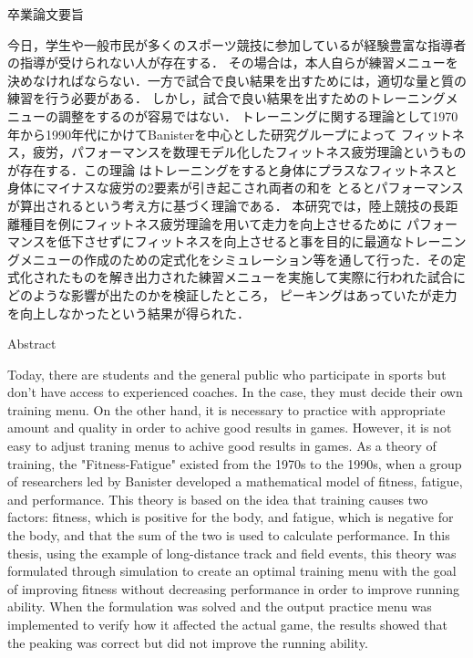 \documentclass[12pt,fleqn]{jreport}
\begin{document}
\begin{center}
  {\huge 卒業論文要旨}
\end{center}
\vspace{3cm}
\large
今日，学生や一般市民が多くのスポーツ競技に参加しているが経験豊富な指導者の指導が受けられない人が存在する．
その場合は，本人自らが練習メニューを決めなければならない．一方で試合で良い結果を出すためには，適切な量と質の練習を行う必要がある．
しかし，試合で良い結果を出すためのトレーニングメニューの調整をするのが容易ではない．
トレーニングに関する理論として1970年から1990年代にかけてBanisterを中心とした研究グループによって
フィットネス，疲労，パフォーマンスを数理モデル化したフィットネス疲労理論というものが存在する．この理論
はトレーニングをすると身体にプラスなフィットネスと身体にマイナスな疲労の2要素が引き起こされ両者の和を
とるとパフォーマンスが算出されるという考え方に基づく理論である．
本研究では，陸上競技の長距離種目を例にフィットネス疲労理論を用いて走力を向上させるために
パフォーマンスを低下させずにフィットネスを向上させると事を目的に最適なトレーニングメニューの作成のための定式化をシミュレーション等を通して行った．その定式化されたものを解き出力された練習メニューを実施して実際に行われた試合にどのような影響が出たのかを検証したところ，
ピーキングはあっていたが走力を向上しなかったという結果が得られた．
\newpage
\thispagestyle{empty}

\begin{center}
  {\huge Abstract}
\end{center}
\vspace{3cm}
Today, there are students and the general public who participate in sports but don't have access to experienced coaches.
In the case, they must decide their own training menu.
On the other hand, it is necessary to practice with appropriate amount and quality in order to achive good results in games.
However, it is not easy to adjust traning menus to achive good results in games.
As a theory of training, the "Fitness-Fatigue" existed from the 1970s to the 1990s, when a group of researchers led by Banister developed a mathematical model of fitness, fatigue, and performance.
This theory is based on the idea that training causes two factors: fitness, which is positive for the body, and fatigue, which is negative for the body, and that the sum of the two is used to calculate performance.
In this thesis, using the example of long-distance track and field events, this theory was formulated through simulation to create an optimal training menu with the goal of improving fitness without decreasing performance in order to improve running ability.
When the formulation was solved and the output practice menu was implemented to verify how it affected the actual game, the results showed that the peaking was correct but did not improve the running ability.
\end{document}
